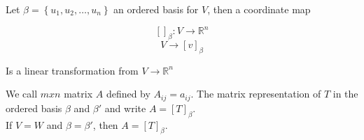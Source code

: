 \documentclass{report}
\begin{document}
    \begin{thBox}
        Let $\beta = \left\{ u_1, u_2, \dots , u_n \right\}$ an ordered basis for $V$, then a coordinate map

        $$[]_\beta: V \to \mathbb{R}^n$$
        $$V \to [v]_\beta$$

        Is a linear transformation from $V \to \mathbb{R}^n$
    \end{thBox}

    \begin{defBox}
        We call $mxn$ matrix $A$ defined by $A_{ij} = a_{ij}$. The matrix representation of $T$ in the ordered basis $\beta$ and $\beta'$ and write $A = [T]_\beta$.\\

        If $V = W$ and $\beta = \beta'$, then $A = [T]_\beta$.
    \end{defBox}
\end{document}
